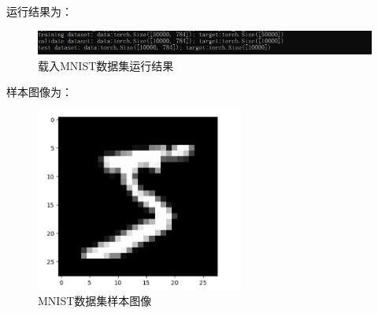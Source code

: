 \documentclass[UTF8]{article}
\begin{document}
运行结果为：
\begin{figure}[H]
	\caption{载入MNIST数据集运行结果}
	\label{f000079}
	\centering
	\includegraphics[width=15cm]{images/f000079}
\end{figure}
样本图像为：
\begin{figure}[H]
	\caption{MNIST数据集样本图像}
	\label{f000080}
	\centering
	\includegraphics[height=6cm]{images/f000080}
\end{figure}
\end{document}
